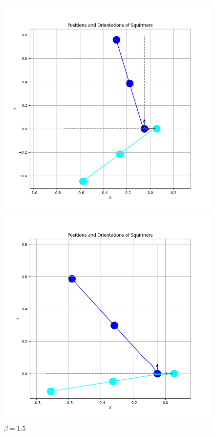 \documentclass{article}
\begin{document}
\begin{figure}[H]
    \centering
    \begin{minipage}{0.49\textwidth}
        \includegraphics[width=1.1\textwidth]{graphs/simulations/sim_sq_sq/betam1_5/pi_.png}
        \caption{\footnotesize $\beta = -1.5$}
    \end{minipage}\hfill
    \begin{minipage}{0.49\textwidth}
        \includegraphics[width=1.1\textwidth]{graphs/simulations/sim_sq_sq/beta1_5/pi_.png}
        \caption{\footnotesize $\beta = 1.5$}
    \end{minipage}
\end{figure}
\end{document}
